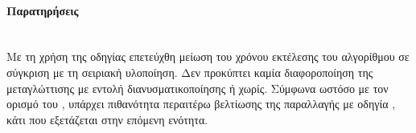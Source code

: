 \paragraph{Παρατηρήσεις}
\ \\
Με τη χρήση της οδηγίας \emph{} επετεύχθη μείωση του χρόνου εκτέλεσης του αλγορίθμου σε σύγκριση με τη σειριακή υλοποίηση. Δεν προκύπτει καμία διαφοροποίηση της μεταγλώττισης με εντολή διανυσματικοποίησης ή χωρίς. Σύμφωνα ωστόσο με τον ορισμό του , υπάρχει πιθανότητα περαιτέρω βελτίωσης της παραλλαγής με οδηγία , κάτι που εξετάζεται στην επόμενη ενότητα.
%
